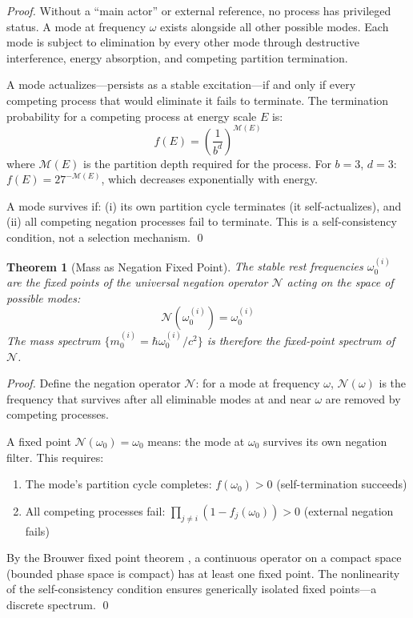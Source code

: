 \documentclass[twocolumn,10pt,a4paper]{article}
\newtheorem{theorem}{Theorem}[section]
\theoremstyle{definition}
\theoremstyle{remark}
\newcommand{\Depth}{\mathcal{M}}
\begin{document}
\begin{proof}
Without a ``main actor'' or external reference, no process has privileged status. A mode at frequency $\omega$ exists alongside all other possible modes. Each mode is subject to elimination by every other mode through destructive interference, energy absorption, and competing partition termination.

A mode actualizes---persists as a stable excitation---if and only if every competing process that would eliminate it fails to terminate. The termination probability for a competing process at energy scale $E$ is:
\begin{equation}
    f(E) = \left(\frac{1}{b^d}\right)^{\Depth(E)}
\end{equation}
where $\Depth(E)$ is the partition depth required for the process. For $b = 3$, $d = 3$: $f(E) = 27^{-\Depth(E)}$, which decreases exponentially with energy.

A mode survives if: (i) its own partition cycle terminates (it self-actualizes), and (ii) all competing negation processes fail to terminate. This is a self-consistency condition, not a selection mechanism. \qed
\end{proof}

\begin{theorem}[Mass as Negation Fixed Point]
\label{thm:mass-fixedpoint}
The stable rest frequencies $\omega_0^{(i)}$ are the fixed points of the universal negation operator $\mathcal{N}$ acting on the space of possible modes:
\begin{equation}
    \mathcal{N}(\omega_0^{(i)}) = \omega_0^{(i)}
\end{equation}
The mass spectrum $\{m_0^{(i)} = \hbar\omega_0^{(i)}/c^2\}$ is therefore the fixed-point spectrum of $\mathcal{N}$.
\end{theorem}

\begin{proof}
Define the negation operator $\mathcal{N}$: for a mode at frequency $\omega$, $\mathcal{N}(\omega)$ is the frequency that survives after all eliminable modes at and near $\omega$ are removed by competing processes.

A fixed point $\mathcal{N}(\omega_0) = \omega_0$ means: the mode at $\omega_0$ survives its own negation filter. This requires:
\begin{enumerate}
    \item The mode's partition cycle completes: $f(\omega_0) > 0$ (self-termination succeeds)
    \item All competing processes fail: $\prod_{j \neq i} (1 - f_j(\omega_0)) > 0$ (external negation fails)
\end{enumerate}

By the Brouwer fixed point theorem \citep{brouwer1911}, a continuous operator on a compact space (bounded phase space is compact) has at least one fixed point. The nonlinearity of the self-consistency condition ensures generically isolated fixed points---a discrete spectrum. \qed
\end{proof}
\end{document}
